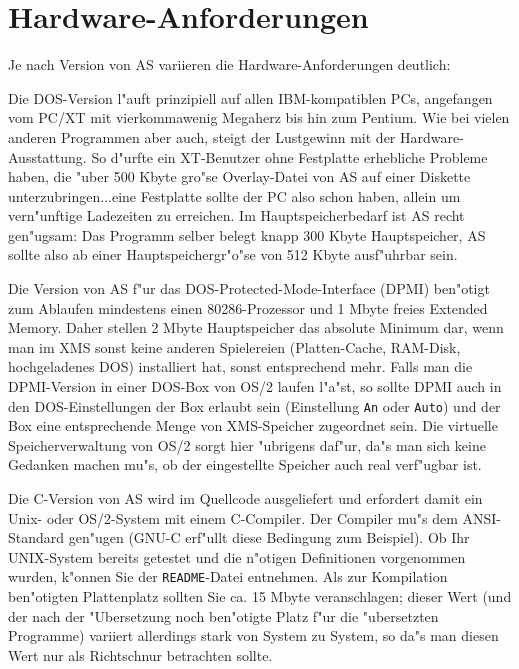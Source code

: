 \documentclass[12pt,a4paper,twoside]{report}
\newcommand{\tty}[1]{{\tt #1}}
\newcommand{\asname}{AS}
\begin{document}

\section{Hardware-Anforderungen}

Je nach Version von \asname{} variieren die Hardware-Anforderungen deutlich:

Die DOS-Version  l"auft prinzipiell auf allen
IBM-kompatiblen PCs, angefangen vom PC/XT mit vierkommawenig Megaherz bis
hin zum Pentium.  Wie bei vielen anderen Programmen aber auch, steigt der
Lustgewinn mit der Hardware-Ausstattung.  So d"urfte ein XT-Benutzer ohne
Festplatte erhebliche Probleme haben, die "uber 500 Kbyte gro"se
Overlay-Datei von \asname{} auf einer Diskette unterzubringen...eine Festplatte
sollte der PC also schon haben, allein um vern"unftige Ladezeiten zu
erreichen.  Im Hauptspeicherbedarf ist \asname{} recht gen"ugsam: Das Programm
selber belegt knapp 300 Kbyte Hauptspeicher, \asname{} sollte also ab einer
Hauptspeichergr"o"se von 512 Kbyte ausf"uhrbar sein.

Die Version von \asname{} f"ur das 
DOS-Protected-Mode-Interface (DPMI) ben"otigt zum Ablaufen mindestens
einen 80286-Prozessor und 1 Mbyte freies Extended Memory.  Daher stellen 2
Mbyte Hauptspeicher das absolute Minimum dar, wenn man im XMS sonst keine
anderen Spielereien (Platten-Cache, RAM-Disk, hochgeladenes DOS)
installiert hat, sonst entsprechend mehr.  Falls man die DPMI-Version in
einer DOS-Box von OS/2 laufen l"a"st, so sollte DPMI auch in den
DOS-Einstellungen der Box erlaubt sein (Einstellung \tty{An} oder
\tty{Auto}) und der Box eine entsprechende Menge von XMS-Speicher
zugeordnet sein.  Die virtuelle Speicherverwaltung von OS/2 sorgt hier
"ubrigens daf"ur, da"s man sich keine Gedanken machen mu"s, ob der
eingestellte Speicher auch real verf"ugbar ist.

Die C-Version  von \asname{} wird im Quellcode ausgeliefert
und erfordert damit ein Unix- oder OS/2-System mit einem C-Compiler.
Der Compiler mu"s dem ANSI-Standard gen"ugen (GNU-C erf"ullt diese
Bedingung zum Beispiel).  Ob Ihr UNIX-System bereits getestet und die
n"otigen Definitionen vorgenommen wurden, k"onnen Sie der \tty{README}-Datei
entnehmen.  Als zur Kompilation ben"otigten Plattenplatz sollten Sie
ca. 15 Mbyte veranschlagen; dieser Wert (und der nach der "Ubersetzung
noch ben"otigte Platz f"ur die "ubersetzten Programme) variiert
allerdings stark von System zu System, so da"s man diesen Wert nur als
Richtschnur betrachten sollte.
\end{document}
